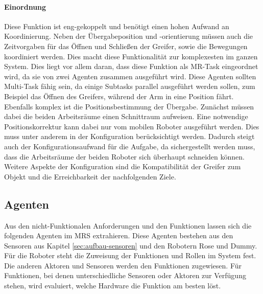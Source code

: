 \paragraph{Einordnung}
Diese Funktion ist eng-gekoppelt und benötigt einen hohen Aufwand an Koordinierung. Neben der Übergabeposition und -orientierung müssen auch die Zeitvorgaben für das Öffnen und Schließen der Greifer, sowie die Bewegungen koordiniert werden. Dies macht diese Funktionalität zur komplexesten im ganzen System. Dies liegt vor allem daran, dass diese Funktion als MR-Task eingeordnet wird, da sie von zwei Agenten zusammen ausgeführt wird. Diese Agenten sollten Multi-Task fähig sein, da einige Subtasks parallel ausgeführt werden sollen, zum Beispiel das Öffnen des Greifers, während der Arm in eine Position fährt. Ebenfalls komplex ist die Positionsbestimmung der Übergabe. Zunächst müssen dabei die beiden Arbeitsräume einen Schnittraum aufweisen. Eine notwendige Positionskorrektur kann dabei nur vom mobilen Roboter ausgeführt werden. Dies muss unter anderem in der Konfiguration berücksichtigt werden. Dadurch steigt auch der Konfigurationsaufwand für die Aufgabe, da sichergestellt werden muss, dass die Arbeitsräume der beiden Roboter sich überhaupt schneiden können. Weitere Aspekte der Konfiguration sind die Kompatibilität der Greifer zum Objekt und die Erreichbarkeit der nachfolgenden Ziele.


\subsection{Agenten}
\label{sec:agent}
Aus den nicht-Funktionalen Anforderungen und den Funktionen lassen sich die folgenden Agenten im MRS extrahieren. Diese Agenten bestehen aus den Sensoren aus Kapitel \ref{sec:aufbau-sensoren} und den Robotern Rose und Dummy. Für die Roboter steht die Zuweisung der Funktionen und Rollen im System fest. Die anderen Aktoren und Sensoren werden den Funktionen zugewiesen. Für Funktionen, bei denen unterschiedliche Sensoren oder Aktoren zur Verfügung stehen, wird evaluiert, welche Hardware die Funktion am besten löst.

